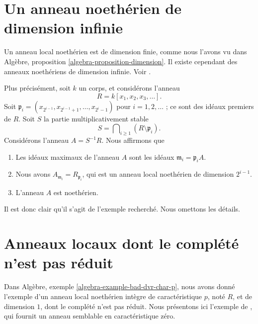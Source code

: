 \section{Un anneau noethérien de dimension infinie}
\label{section-Noetherian-infinite-dimension}

\noindent
Un anneau local noethérien est de dimension finie, comme nous l'avons vu dans
Algèbre, proposition \ref{algebra-proposition-dimension}.
Il existe cependant des anneaux noethériens de dimension infinie.
Voir \cite[Appendix, exemple 1]{Nagata}.

\medskip\noindent
Plus précisément, soit $k$ un corps, et considérons l'anneau
$$
R = k[x_1, x_2, x_3, \ldots ].
$$
Soit $\mathfrak p_i = (x_{2^{i - 1}}, x_{2^{i - 1} + 1}, \ldots, x_{2^i - 1})$
pour $i = 1, 2, \ldots$ ; ce sont des idéaux premiers de $R$. Soit $S$
la partie multiplicativement stable
$$
S = \bigcap\nolimits_{i \geq 1} (R \setminus \mathfrak p_i).
$$
Considérons l'anneau $A = S^{-1}R$.
Nous affirmons que
\begin{enumerate}
\item Les idéaux maximaux de l'anneau $A$ sont les idéaux
$\mathfrak m_i = \mathfrak p_iA$.
\item Nous avons $A_{\mathfrak m_i} = R_{\mathfrak p_i}$, qui est
un anneau local noethérien de dimension $2^{i - 1}$.
\item L'anneau $A$ est noethérien.
\end{enumerate}
Il est donc clair qu'il s'agit de l'exemple recherché.
Nous omettons les détails.




\section{Anneaux locaux dont le complété n'est pas réduit}
\label{section-local-completion-nonreduced}

\noindent
Dans Algèbre, exemple \ref{algebra-example-bad-dvr-char-p}, nous avons donné l'exemple
d'un anneau local noethérien intègre de caractéristique $p$, noté $R$, et de dimension $1$,
dont le complété n'est pas réduit. Nous présentons ici l'exemple
de \cite[Proposition 3.1]{Ferrand-Raynaud}, qui fournit un anneau semblable
en caractéristique zéro.

